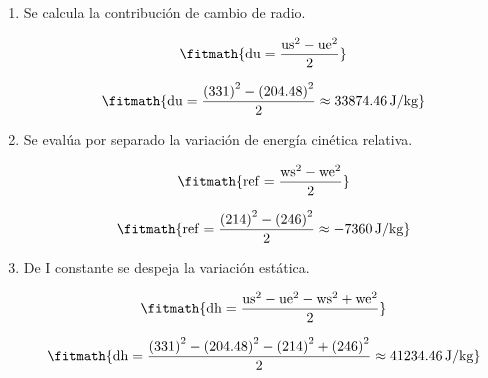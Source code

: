 \begin{enumerate}

\item Se calcula la contribución de cambio de radio.

\[\fitmath{\mathrm{du}=\frac{{\mathrm{us}}^{2}-{\mathrm{ue}}^{2}}{2}}\]

\[\fitmath{\mathrm{du}=\frac{{(331)}^{2}-{(204.48)}^{2}}{2}\approx 33874.46\,\mathrm{J/kg}}\]

\item Se evalúa por separado la variación de energía cinética relativa.

\[\fitmath{\mathrm{ref}=\frac{{\mathrm{ws}}^{2}-{\mathrm{we}}^{2}}{2}}\]

\[\fitmath{\mathrm{ref}=\frac{{(214)}^{2}-{(246)}^{2}}{2}\approx -7360\,\mathrm{J/kg}}\]

\item De I constante se despeja la variación estática.

\[\fitmath{\mathrm{dh}=\frac{{\mathrm{us}}^{2}-{\mathrm{ue}}^{2}-{\mathrm{ws}}^{2}+{\mathrm{we}}^{2}}{2}}\]

\[\fitmath{\mathrm{dh}=\frac{{(331)}^{2}-{(204.48)}^{2}-{(214)}^{2}+{(246)}^{2}}{2}\approx 41234.46\,\mathrm{J/kg}}\]

\end{enumerate}
